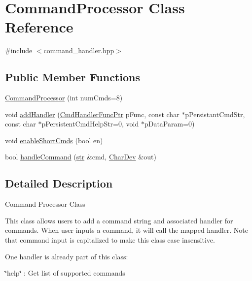 \hypertarget{classCommandProcessor}{}\section{Command\+Processor Class Reference}
\label{classCommandProcessor}


{\ttfamily \#include $<$command\+\_\+handler.\+hpp$>$}

\subsection*{Public Member Functions}
\begin{DoxyCompactItemize}
\item 
\hyperlink{classCommandProcessor_a18664bab9b263b9529e710c6189a8d17}{Command\+Processor} (int num\+Cmds=8)
\item 
void \hyperlink{classCommandProcessor_ae3511e02206714e63d02e7d6bdcad102}{add\+Handler} (\hyperlink{command__handler_8hpp_a56cc0ed4a4ef4fe8aaca51669f2d15f5}{Cmd\+Handler\+Func\+Ptr} p\+Func, const char $\ast$p\+Persistant\+Cmd\+Str, const char $\ast$p\+Persistent\+Cmd\+Help\+Str=0, void $\ast$p\+Data\+Param=0)
\item 
void \hyperlink{classCommandProcessor_ab5acea00ab45c71c5f5ce84ad683cca6}{enable\+Short\+Cmds} (bool en)
\end{DoxyCompactItemize}
{\bf }\par
\begin{DoxyCompactItemize}
\item 
bool \hyperlink{classCommandProcessor_a0f25f294a57e8316b357aa9d56142b6c}{handle\+Command} (\hyperlink{classstr}{str} \&cmd, \hyperlink{classCharDev}{Char\+Dev} \&out)
\end{DoxyCompactItemize}



\subsection{Detailed Description}
Command Processor Class

This class allows users to add a command string and associated handler for commands. When user inputs a command, it will call the mapped handler. Note that command input is capitalized to make this class case insensitive.

One handler is already part of this class\+:
\begin{DoxyItemize}
\item \char`\"{}help\char`\"{} \+: Get list of supported commands
\end{DoxyItemize}

